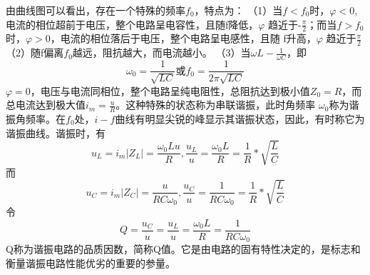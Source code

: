 \documentclass[UTF-8,twoside,cs4size]{ctexart}
\begin{document}
由曲线图可以看出，存在一个特殊的频率$f_0$，特点为：
（1）当$f<f_0$时，$\varphi <0$,电流的相位超前于电压，整个电路呈电容性，且随f降低，$\varphi$ 趋近于-$\frac{\pi }{2}$；而当$f>f_0$时，$\varphi >0$，电流的相位落后于电压，整个电路呈电感性，且随
f升高，$\varphi$ 趋近于$\frac{\pi }{2}$
（2）随f偏离$f_0$越远，阻抗越大，而电流越小。
（3）当$\omega L-\frac{1}{\omega C}$，即
\begin{equation}
    \omega _0=\frac{1}{\sqrt{LC} } 或 f_0=\frac{1}{2\pi \sqrt{LC} }
\end{equation}
$\varphi  = 0$，电压与电流同相位，整个电路呈纯电阻性，总阻抗达到极小值$Z_0=R$，而总电流达到极大值$i_m=\frac{u}{R}$。这种特殊的状态称为串联谐振，此时角频率
$\omega _0$称为谐振角频率。在$f_0$处，$i − f$曲线有明显尖锐的峰显示其谐振状态，因此，有时称它为谐振曲线。谐振时，有
\begin{equation}
    u_L=i_m\left\lvert Z_L\right\rvert =\frac{{\omega _0}Lu}{R},\frac{u_L}{u}=\frac{{\omega _0}L}{R}=\frac{1}{R}*\sqrt{\frac{L}{C}}
\end{equation}
而
\begin{equation}
    u_C=i_m\left\lvert Z_C\right\rvert =\frac{u}{RC{\omega _0}},\frac{u_C}{u}=\frac{1}{RC{\omega _0}}=\frac{1}{R}*\sqrt{\frac{L}{C}}
\end{equation}
令
\begin{equation}
    Q=\frac{u_C}{u}=\frac{u_L}{u}=\frac{{\omega _0}L}{R}=\frac{1}{RC{\omega _0}}
\end{equation}
Q称为谐振电路的品质因数，简称Q值。它是由电路的固有特性决定的，是标志和衡量谐振电路性能优劣的重要的参量。
\end{document}
